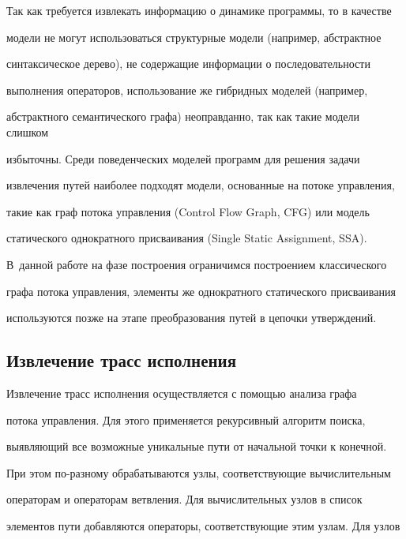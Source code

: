 Так как требуется извлекать информацию о динамике программы, то в качестве


модели не могут использоваться структурные модели (например, абстрактное


синтаксическое дерево), не содержащие информации о последовательности


выполнения операторов, использование же гибридных моделей (например,


абстрактного семантического графа) неоправданно, так как такие модели слишком


избыточны. Среди поведенческих моделей программ для решения задачи


извлечения путей наиболее подходят модели, основанные на потоке управления,


такие как граф потока управления (Control Flow Graph, CFG) или модель


статического однократного присваивания (Single Static Assignment, SSA).


В~данной работе на фазе построения ограничимся построением классического


графа потока управления, элементы же однократного статического присваивания


используются позже на этапе преобразования путей в цепочки утверждений.





      \vspace*{-6pt}





      \subsection{Извлечение трасс исполнения}





     Извлечение трасс исполнения осуществляется с помощью анализа графа


потока управления. Для этого применяется рекурсивный алгоритм поиска,


выявляющий все возможные уникальные пути от начальной точки к конечной.


При этом по-раз\-но\-му обрабатываются узлы, соответствующие вычислительным


операторам и операторам ветвления. Для вычислительных узлов в список


элементов пути добавляются операторы, соответствующие этим узлам. Для узлов


